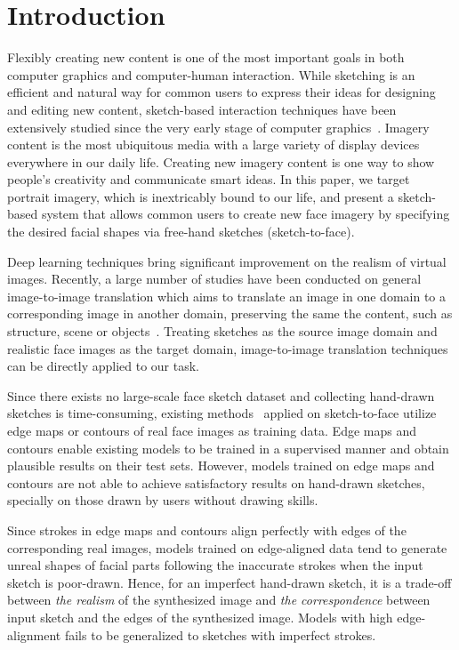 
\section{Introduction}



Flexibly creating new content is one of the most important goals in both computer graphics and computer-human interaction. While sketching is an efficient and natural way for common users to express their ideas for designing and editing new content, sketch-based interaction techniques have been extensively studied since the very early stage of computer graphics~\cite{SutherlandSketchPad64,Zeleznik-Sketch96,Igarashi-teddy99,Chen_sketchingreality08,Chen09sketch2photo}. 
Imagery content is the most ubiquitous media with a large variety of display devices everywhere in our daily life. 
Creating new imagery content is one way to show people's creativity and communicate smart ideas.
%
In this paper, we target portrait imagery, which is inextricably bound to our life, and present a sketch-based system that allows common users to create new face imagery by specifying the desired facial shapes via free-hand sketches (sketch-to-face). 

Deep learning techniques bring significant improvement on the realism of virtual images. 
Recently, a large number of studies have been conducted on general image-to-image translation which aims to translate an image in one domain to a corresponding image in another domain, preserving the same the content, such as structure, scene or objects~\cite{pix2pix,pix2pixHD,CycleGANs,DualGAN, DiscoGANs, DualGANs,BicycleGANs}. 
%
Treating sketches as the source image domain and realistic face images as the target domain, image-to-image translation techniques can be directly applied to our task. 

Since there exists no large-scale face sketch dataset and collecting hand-drawn sketches is time-consuming, existing methods~\cite{pix2pix, pix2pixHD, Lines2Face} applied on sketch-to-face utilize edge maps or contours of real face images as training data. Edge maps and contours enable existing models to be trained in a supervised manner and obtain plausible results on their test sets. 
%
However, models trained on edge maps and contours are not able to achieve satisfactory results on hand-drawn sketches, specially on those drawn by users without drawing skills. 

Since strokes in edge maps and contours align perfectly with edges of the corresponding real images, models trained on edge-aligned data tend to generate unreal shapes of facial parts following the inaccurate strokes when the input sketch is poor-drawn. Hence, for an imperfect hand-drawn sketch, it is a trade-off between \textit{the realism} of the synthesized image and \textit{the correspondence} between input sketch and the edges of the synthesized image.
Models with high edge-alignment fails to be generalized to sketches with imperfect strokes.

